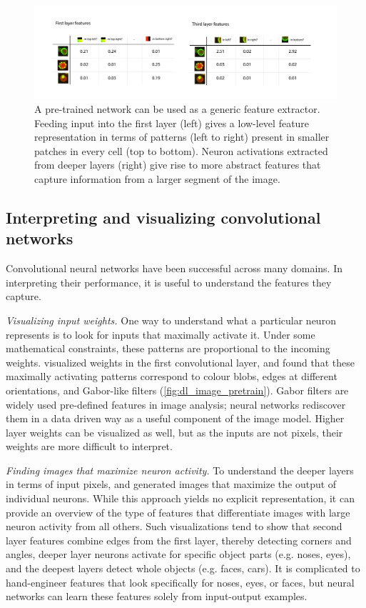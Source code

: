\begin{figure}[htbp!]
\centering
\includegraphics[width=1.0\textwidth]{image_pretrain}
\caption[Feature extraction with pre-trained convolutional neural networks.]{A pre-trained network can be used as a generic feature extractor. Feeding input into the first layer (left) gives a low-level feature representation in terms of patterns (left to right) present in smaller patches in every cell (top to bottom). Neuron activations extracted from deeper layers (right) give rise to more abstract features that capture information from a larger segment of the image.}
\label{fig:dl_image_pretrain}
\end{figure}

\subsection{Interpreting and visualizing convolutional networks}
Convolutional neural networks have been successful across many domains. In interpreting their performance, it is useful to understand the features they capture.

\textit{Visualizing input weights.} One way to understand what a particular neuron represents is to look for inputs that maximally activate it. Under some mathematical constraints, these patterns are proportional to the incoming weights. \citet{krizhevsky_imagenet_2012} visualized weights in the first convolutional layer, and found that these maximally activating patterns correspond to colour blobs, edges at different orientations, and Gabor-like filters (\autoref{fig:dl_image_pretrain}). Gabor filters are widely used pre-defined features in image analysis; neural networks rediscover them in a data driven way as a useful component of the image model. Higher layer weights can be visualized as well, but as the inputs are not pixels, their weights are more difficult to interpret.

\textit{Finding images that maximize neuron activity.} To understand the deeper layers in terms of input pixels, \citet{girshick_rich_2014} and \citet{simonyan_deep_2013} generated images that maximize the output of individual neurons. While this approach yields no explicit representation, it can provide an overview of the type of features that differentiate images with large neuron activity from all others.  Such visualizations tend to show that second layer features combine edges from the first layer, thereby detecting corners and angles, deeper layer neurons activate for specific object parts (e.g. noses, eyes), and the deepest layers detect whole objects (e.g. faces, cars). It is complicated to hand-engineer features that look specifically for noses, eyes, or faces, but neural networks can learn these features solely from input-output examples.

